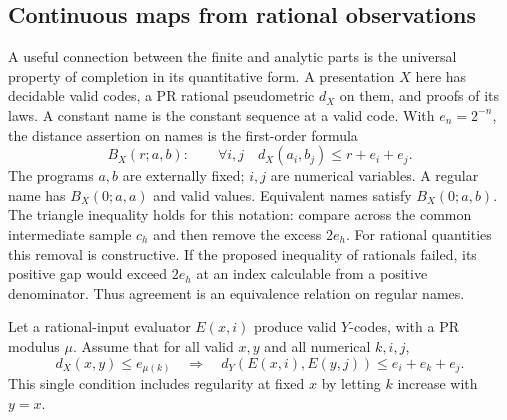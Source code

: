 \subsection{Continuous maps from rational observations}\label{sec:completion}
A useful connection between the finite and analytic parts is the universal property of completion in its quantitative form. A presentation $X$ here has decidable valid codes, a PR rational pseudometric $d_X$ on them, and proofs of its laws. A constant name is the constant sequence at a valid code. With $e_n=2^{-n}$, the distance assertion on names is the first-order formula
\[
 B_X(r;a,b):\qquad \forall i,j\quad d_X(a_i,b_j)\le r+e_i+e_j .
\]
The programs $a,b$ are externally fixed; $i,j$ are numerical variables. A regular name has $B_X(0;a,a)$ and valid values. Equivalent names satisfy $B_X(0;a,b)$. The triangle inequality holds for this notation: compare across the common intermediate sample $c_h$ and then remove the excess $2e_h$. For rational quantities this removal is constructive. If the proposed inequality of rationals failed, its positive gap would exceed $2e_h$ at an index calculable from a positive denominator. Thus agreement is an equivalence relation on regular names.

Let a rational-input evaluator $E(x,i)$ produce valid $Y$-codes, with a PR modulus $\mu$. Assume that for all valid $x,y$ and all numerical $k,i,j$,
\begin{equation}\label{eq:approx}
 d_X(x,y)\le e_{\mu(k)}
 \quad\Longrightarrow\quad
 d_Y(E(x,i),E(y,j))\le e_i+e_k+e_j .
\end{equation}
This single condition includes regularity at fixed $x$ by letting $k$ increase with $y=x$.

